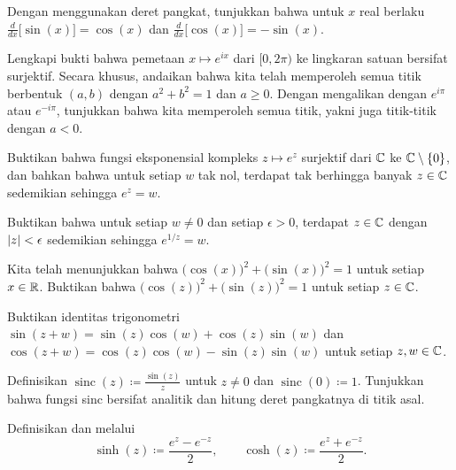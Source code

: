 \begin{exercise}
Dengan menggunakan deret pangkat, tunjukkan bahwa untuk $x$ real berlaku
$\frac{d}{dx} \bigl[ \sin(x)\bigr] = \cos(x)$ dan
$\frac{d}{dx} \bigl[ \cos(x)\bigr] = -\sin(x)$.
\end{exercise}

\begin{exercise}
Lengkapi bukti bahwa pemetaan $x \mapsto e^{ix}$ dari
$[0,2\pi)$ ke lingkaran satuan bersifat surjektif. Secara khusus, andaikan bahwa
kita telah memperoleh semua titik berbentuk $(a,b)$ dengan $a^2+b^2=1$ dan $a \geq 0$.
Dengan mengalikan dengan $e^{i\pi}$ atau $e^{-i\pi}$, tunjukkan bahwa kita memperoleh
semua titik, yakni juga titik-titik dengan $a < 0$.
\end{exercise}

\begin{exercise}
Buktikan bahwa fungsi eksponensial kompleks $z \mapsto e^z$ surjektif dari ${\mathbb{C}}$
ke ${\mathbb{C}} \setminus \{ 0 \}$, dan bahkan
bahwa untuk setiap $w$ tak nol, terdapat tak berhingga banyak $z \in {\mathbb{C}}$ sedemikian sehingga $e^z=w$.
\end{exercise}

\begin{exercise}
Buktikan bahwa untuk setiap $w \neq 0$ dan setiap $\epsilon > 0$,
terdapat $z \in {\mathbb{C}}$ dengan $\lvert {z} \rvert < \epsilon$ sedemikian sehingga $e^{1/z} = w$.
\end{exercise}

\begin{exercise}\label{exercise:cossinidentity}
Kita telah menunjukkan bahwa
${\bigl( \cos(x) \bigr)}^2 + {\bigl( \sin(x) \bigr)}^2 = 1$
untuk setiap $x \in {\mathbb{R}}$.
Buktikan bahwa
${\bigl( \cos(z) \bigr)}^2 + {\bigl( \sin(z) \bigr)}^2 = 1$
untuk setiap $z \in {\mathbb{C}}$.
\end{exercise}

\begin{exercise}
Buktikan identitas trigonometri
$\sin(z + w) = \sin(z) \cos(w) + \cos(z) \sin(w)$ dan
$\cos(z + w) = \cos(z) \cos(w) - \sin(z) \sin(w)$ untuk setiap $z,w \in {\mathbb{C}}$.
\end{exercise}

\begin{exercise}
Definisikan $\operatorname{sinc}(z) \coloneqq \frac{\sin(z)}{z}$ untuk $z \neq 0$ dan
$\operatorname{sinc}(0) \coloneqq 1$.
Tunjukkan bahwa fungsi sinc bersifat analitik dan hitung deret pangkatnya di titik asal.
\end{exercise}

\begin{exnote}
\pagebreak[2]
Definisikan \emph{} dan
\emph{} melalui
\begin{equation*}
\sinh(z) \coloneqq \frac{e^z-e^{-z}}{2}, \qquad
\cosh(z) \coloneqq \frac{e^z+e^{-z}}{2}.
\end{equation*}
\end{exnote}


